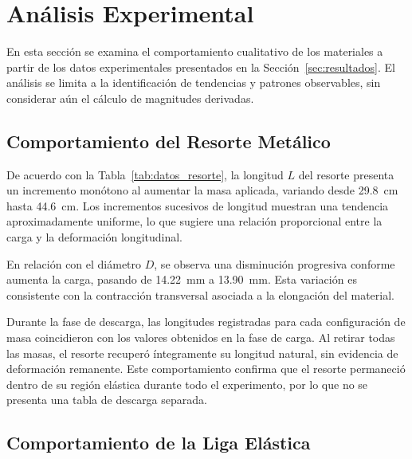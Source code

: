 
\section{Análisis Experimental}

En esta sección se examina el comportamiento cualitativo de los materiales
a partir de los datos experimentales presentados en la
Sección~\ref{sec:resultados}. El análisis se limita a la identificación de
tendencias y patrones observables, sin considerar aún el cálculo de
magnitudes derivadas.

\subsection{Comportamiento del Resorte Metálico}

De acuerdo con la Tabla~\ref{tab:datos_resorte}, la longitud $L$ del
resorte presenta un incremento monótono al aumentar la masa aplicada,
variando desde \qty{29,8}{cm} hasta \qty{44,6}{cm}. Los incrementos
sucesivos de longitud muestran una tendencia aproximadamente uniforme,
lo que sugiere una relación proporcional entre la carga y la deformación
longitudinal.

En relación con el diámetro $D$, se observa una disminución progresiva
conforme aumenta la carga, pasando de \qty{14,22}{mm} a
\qty{13,90}{mm}. Esta variación es consistente con la contracción
transversal asociada a la elongación del material.

Durante la fase de descarga, las longitudes registradas para cada
configuración de masa coincidieron con los valores obtenidos en la fase
de carga. Al retirar todas las masas, el resorte recuperó íntegramente
su longitud natural, sin evidencia de deformación remanente. Este
comportamiento confirma que el resorte permaneció dentro de su región
elástica durante todo el experimento, por lo que no se presenta una
tabla de descarga separada.

\subsection{Comportamiento de la Liga Elástica}


